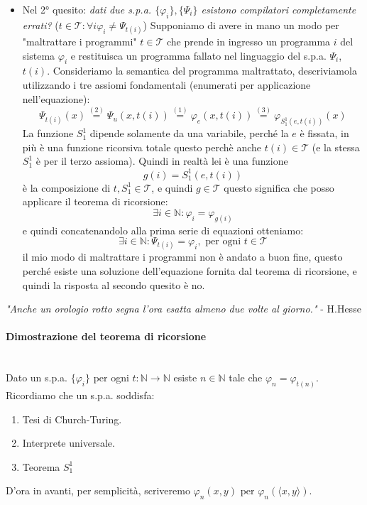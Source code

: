 \documentclass{article}
\begin{document}
\begin{itemize}
    \item Nel 2° quesito: \textit{dati due s.p.a. $\{\varphi_i\},\{\Psi_i\}$ esistono compilatori completamente errati?}
          ($t\in\mathcal{T}:\forall i \varphi_i\neq\Psi_{t(i)}$) Supponiamo di avere in mano un modo
          per "maltrattare i programmi" $t\in\mathcal{T}$ che prende in ingresso un programma $i$ del sistema $\varphi_i$
          e restituisca un programma fallato nel linguaggio del s.p.a. $\Psi_i$, $t(i)$.
          Consideriamo la semantica del programma maltrattato, descriviamola utilizzando
          i tre assiomi fondamentali (enumerati per applicazione nell'equazione):
          $$\Psi_{t(i)}(x)\overset{(2)}{=}\Psi_u(x,t(i))\overset{(1)}{=}\varphi_e(x,t(i))\overset{(3)}{=}\varphi_{S_1^1(e,t(i))}(x)$$
          La funzione $S_1^1$ dipende solamente da una variabile, perché la $e$ è fissata, in più è
          una funzione ricorsiva totale questo perchè anche $t(i)\in\mathcal{T}$ (e la stessa $S_1^1$ è per
          il terzo assioma). Quindi in realtà lei è una funzione
          $$g(i)=S_1^1(e,t(i))$$ è la composizione di $t,S_1^1\in\mathcal{T}$, e quindi $g\in\mathcal{T}$
          questo significa che posso applicare il teorema di ricorsione:
          $$\exists i\in\mathbb{N}:\varphi_i=\varphi_{g(i)}$$
          e quindi concatenandolo alla prima serie di equazioni otteniamo:
          $$\exists i\in\mathbb{N}:\Psi_{t(i)}=\varphi_i,\text{ per ogni }t\in\mathcal{T}$$
          il mio modo di maltrattare i programmi non è andato a buon fine, questo perché esiste
          una soluzione dell'equazione fornita dal teorema di ricorsione, e quindi la risposta al
          secondo quesito è no.
\end{itemize}

\begin{center}
    \textit{"Anche un orologio rotto segna l'ora esatta almeno due volte al giorno."} - H.Hesse
\end{center}

\paragraph{Dimostrazione del teorema di ricorsione}\mbox{}\\
Dato un s.p.a. $\{\varphi_i\}$ per ogni $t:\mathbb{N}\rightarrow\mathbb{N}$ esiste
$n\in\mathbb{N}$ tale che $\varphi_n=\varphi_{t(n)}$.
Ricordiamo che un s.p.a. soddisfa:
\begin{enumerate}
    \item Tesi di Church-Turing.
    \item Interprete universale.
    \item Teorema $S_1^1$
\end{enumerate}
D'ora in avanti, per semplicità, scriveremo $\varphi_n(x,y)$ per $\varphi_n(\langle x,y\rangle)$.
\end{document}
